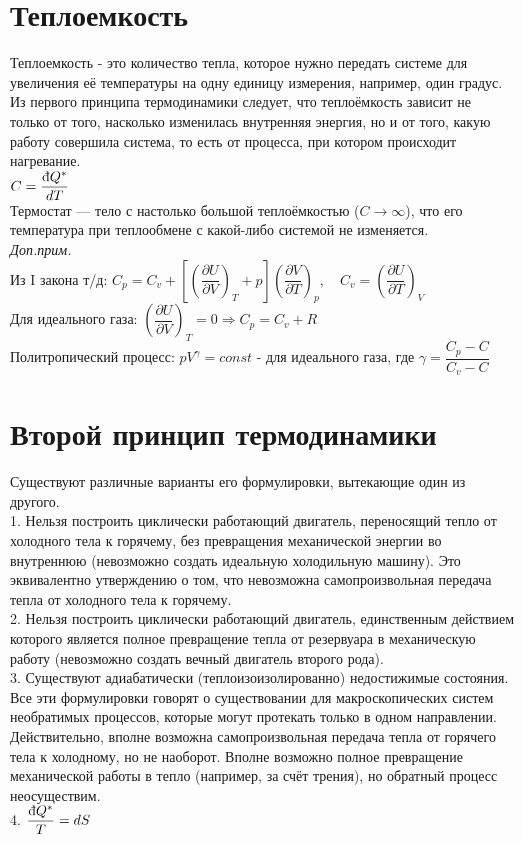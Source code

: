 \begin{multicols*}{2}
		\section{Теплоемкость}
		Теплоемкость - это количество тепла, которое нужно передать системе для увеличения её температуры на одну единицу измерения, например, один градус. Из первого принципа термодинамики следует, что теплоёмкость зависит не только от того, насколько изменилась внутренняя энергия, но и от того, какую работу совершила система, то есть от процесса, при котором происходит нагревание.\\
		$C = \dfrac{\mbox{\dj} Q^*}{dT}$\\
		Термостат — тело с настолько большой теплоёмкостью ($C \rightarrow \infty$), что его температура при теплообмене с какой-либо системой не изменяется.\\
		\textit{Доп.прим.}\\
		Из I закона т/д: $C_p = C_v + \left[\left(\dfrac{\partial U}{\partial V}\right)_T + p\right]\left(\dfrac{\partial V}{\partial T}\right)_p, \quad C_v = \left(\dfrac{\partial U}{\partial T}\right)_V$\\
		Для идеального газа: $\left(\dfrac{\partial U}{\partial V}\right)_T = 0 \Rightarrow C_p = C_v + R$\\
		Политропический процесс: $pV^\gamma = const$ - для идеального газа, где $\gamma = \dfrac{C_p - C}{C_v - C}$\\

		\section{Второй принцип термодинамики}
		Существуют различные варианты его формулировки, вытекающие один из другого.\\
		1. Нельзя построить циклически работающий двигатель, переносящий тепло от холодного тела к горячему, без превращения механической энергии во внутреннюю (невозможно создать идеальную холодильную машину). Это эквивалентно утверждению о том, что невозможна самопроизвольная передача тепла от холодного тела к горячему.\\
		2. Нельзя построить циклически работающий двигатель, единственным действием которого является полное превращение тепла от резервуара в механическую работу (невозможно создать вечный двигатель второго рода).\\
		3. Существуют адиабатически (теплоизоизолированно) недостижимые состояния.\\
		Все эти формулировки говорят о существовании для макроскопических систем необратимых процессов, которые могут протекать только в одном направлении. Действительно, вполне возможна самопроизвольная передача тепла от горячего тела к холодному, но не наоборот. Вполне возможно полное превращение механической работы в тепло (например, за счёт трения), но обратный процесс неосуществим.\\
		4. $\dfrac{\mbox{\dj} Q^*}{T} = dS$\\


\end{multicols*}
